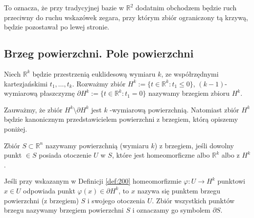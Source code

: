 \documentclass[leqno]{article}
\begin{document}
\begin{justify}
To oznacza, że przy tradycyjnej bazie w $\mathbb{R}^2$ dodatnim obchodzem będzie ruch przeciwny do ruchu wskazówek zegara, przy którym zbiór ograniczony tą krzywą, będzie pozostawał po lewej stronie.

\subsection{Brzeg powierzchni. Pole powierzchni}

Niech $\mathbb{R}^k$ będzie przestrzenią euklidesową wymiaru $k$, ze współrzędnymi kartezjańskimi $t_1, \ldots, t_k$.
Rozważmy zbiór $H^k := \{t \in \mathbb{R}^k : t_1 \leqslant 0\}$, $(k-1)$-wymiarową płaszczyznę
$\partial H^k := \{t \in \mathbb{R}^k : t_1 = 0\}$ nazywamy brzegiem zbioru $H^k$.

Zauważmy, że zbiór $H^k \setminus \partial H^k$ jest $k$ -wymiarową powierzchnią.
Natomiast zbiór $H^k$ będzie kanonicznym przedstawicielem powierzchni z brzegiem, którą opiszemy poniżej.

\begin{defn}
    Zbiór $S \subset \mathbb{R}^n$ nazywamy powierzchnią (wymiaru $k$) z brzegiem, jeśli dowolny punkt $ \in S$ posiada otoczenie $U$ w $S$,
    które jest homeomorficzne albo $\mathbb{R}^k$ albo z $H^k$. 
\end{defn}

\begin{defn}
    Jeśli przy wskazanym w Definicji \ref{def:200} homeomorfizmie $\varphi : U \to H^k$ punktowi $x \in U$ odpowiada punkt $\varphi(x) \in \partial H^k$, to 
    $x$ nazywa się punktem brzegu powierzchni (z brzegiem) $S$ i swojego otoczenia $U$. Zbiór wszystkich punktów brzegu nazywamy brzegiem powierzchni $S$ 
    i oznaczamy go symbolem $\partial S$. 
\end{defn}


\end{justify}
\end{document}
